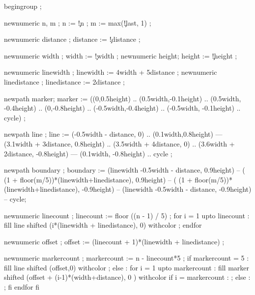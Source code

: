    

  begingroup ;

  newnumeric n, m ;
  n := \visualcounterparameter\c!n ;
  m := max(\visualcounterparameter\c!last, 1) ;

  newnumeric distance ; distance := \visualcounterparameter\c!distance ;

  newnumeric width ; width  := \visualcounterparameter\c!width ;
  newnumeric height; height := \visualcounterparameter\c!height ;

  newnumeric linewidth ; linewidth := 4width + 5distance ;
  newnumeric linedistance ; linedistance := 2distance ;

  newpath    marker; 
  marker := ((0,0.5height) .. (0.5width,-0.1height) .. (0.5width, -0.4height) 
         .. (0,-0.8height) 
         .. (-0.5width,-0.4height) .. (-0.5width, -0.1height) .. cycle) ;

  newpath    line ;
  line   := (-0.5width - distance, 0) .. (0.1width,0.8height) 
        --- (3.1width + 3distance,  0.8height) .. (3.5width + 4distance, 0) .. (3.6width + 2distance, -0.8height)
        --- (0.1width, -0.8height) .. cycle ;

  newpath boundary ;
  boundary := (linewidth -0.5width - distance, 0.9height) 
           -- ( (1 + floor(m/5))*(linewidth+linedistance), 0.9height) 
           -- ( (1 + floor(m/5))*(linewidth+linedistance), -0.9height)
           -- (linewidth -0.5width - distance, -0.9height) 
           -- cycle;


  newnumeric linecount ; linecount := floor ((n - 1) / 5) ;
  for i = 1 upto linecount :
    fill line shifted (i*(linewidth + linedistance), 0)
         withcolor   ;
  endfor

  newnumeric offset ; offset := (linecount + 1)*(linewidth + linedistance) ;

  newnumeric markercount ; markercount := n - linecount*5 ;
  if markercount = 5 :
      fill line shifted (offset,0)
         withcolor 
             ;
  else : for i = 1 upto markercount :
      fill marker shifted (offset + (i-1)*(width+distance), 0 ) 
         withcolor 
         if i = markercount :
             ;
         else :
             ;
         fi
  endfor fi

